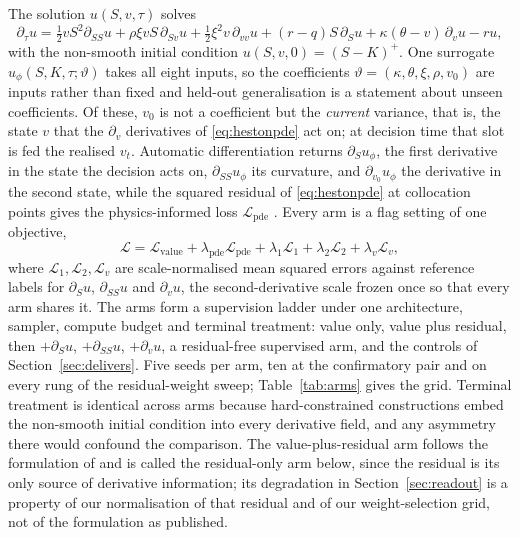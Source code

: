 \documentclass{article}
\begin{document}
The solution $u(S, v, \tau)$ solves
\begin{equation}\label{eq:hestonpde}
\partial_\tau u=\tfrac12 vS^{2}\partial_{SS}u+\rho\xi vS\,\partial_{Sv}u
+\tfrac12\xi^{2}v\,\partial_{vv}u+(r-q)S\,\partial_{S}u
+\kappa(\theta-v)\,\partial_{v}u-ru,
\end{equation}
with the non-smooth initial condition $u(S,v,0)=(S-K)^{+}$. One surrogate
$u_\phi(S,K,\tau;\vartheta)$ takes all eight inputs, so the coefficients
$\vartheta=(\kappa,\theta,\xi,\rho,v_0)$ are inputs rather than fixed and held-out
generalisation is a statement about unseen coefficients. Of these, $v_0$ is not a
coefficient but the \emph{current} variance, that is, the state $v$ that the
$\partial_v$ derivatives of \eqref{eq:hestonpde} act on; at decision time that slot
is fed the realised $v_t$. Automatic differentiation returns $\partial_S u_\phi$,
the first derivative in the state the decision acts on, $\partial_{SS}u_\phi$ its
curvature, and $\partial_{v_0} u_\phi$ the derivative in the second state, while the
squared residual of \eqref{eq:hestonpde} at collocation points gives the
physics-informed loss $\mathcal{L}_{\mathrm{pde}}$ \citep{raissi2019physics}. Every
arm is a flag setting of one objective,
\begin{equation}\label{eq:loss}
\mathcal{L}=\mathcal{L}_{\mathrm{value}}
+\lambda_{\mathrm{pde}}\mathcal{L}_{\mathrm{pde}}
+\lambda_{1}\mathcal{L}_{1}+\lambda_{2}\mathcal{L}_{2}
+\lambda_{v}\mathcal{L}_{v},
\end{equation}
where $\mathcal{L}_{1},\mathcal{L}_{2},\mathcal{L}_{v}$ are scale-normalised mean
squared errors against reference labels for $\partial_S u$, $\partial_{SS}u$ and
$\partial_v u$, the second-derivative scale frozen once so that every arm shares it.
The arms form a supervision ladder under one architecture, sampler, compute budget
and terminal treatment: value only, value plus residual, then $+\partial_S u$,
$+\partial_{SS}u$, $+\partial_v u$, a residual-free supervised arm, and the controls
of Section~\ref{sec:delivers}. Five seeds per arm, ten at the confirmatory pair and
on every rung of the residual-weight sweep; Table~\ref{tab:arms} gives the grid.
Terminal treatment is identical across arms because hard-constrained constructions
\citep{lagaris1998artificial} embed the non-smooth initial condition into every
derivative field, and any asymmetry there would confound the comparison. The
value-plus-residual arm follows the formulation of \citet{hainaut2024option} and is
called the residual-only arm below, since the residual is its only source of
derivative information; its degradation in Section~\ref{sec:readout} is a property
of our normalisation of that residual and of our weight-selection grid, not of the
formulation as published.
\end{document}
